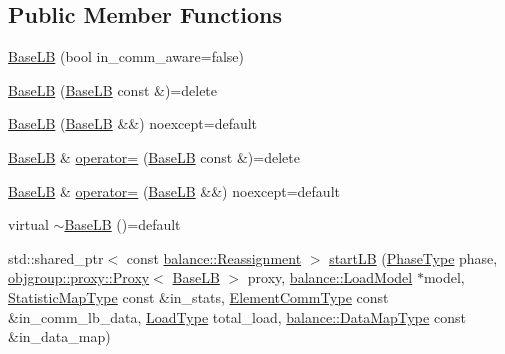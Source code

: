 \subsection*{Public Member Functions}
\begin{DoxyCompactItemize}
\item 
\hyperlink{structvt_1_1vrt_1_1collection_1_1lb_1_1_base_l_b_a96ad04c03781fc057dbfb9049f67530f}{Base\+LB} (bool in\+\_\+comm\+\_\+aware=false)
\item 
\hyperlink{structvt_1_1vrt_1_1collection_1_1lb_1_1_base_l_b_af34c68c8ecf1341189a67c3405036d16}{Base\+LB} (\hyperlink{structvt_1_1vrt_1_1collection_1_1lb_1_1_base_l_b}{Base\+LB} const \&)=delete
\item 
\hyperlink{structvt_1_1vrt_1_1collection_1_1lb_1_1_base_l_b_a1d1ae8a311e14e27b26624caee930535}{Base\+LB} (\hyperlink{structvt_1_1vrt_1_1collection_1_1lb_1_1_base_l_b}{Base\+LB} \&\&) noexcept=default
\item 
\hyperlink{structvt_1_1vrt_1_1collection_1_1lb_1_1_base_l_b}{Base\+LB} \& \hyperlink{structvt_1_1vrt_1_1collection_1_1lb_1_1_base_l_b_a94be0abcbc47bf6a3f3685f94dd5d4cb}{operator=} (\hyperlink{structvt_1_1vrt_1_1collection_1_1lb_1_1_base_l_b}{Base\+LB} const \&)=delete
\item 
\hyperlink{structvt_1_1vrt_1_1collection_1_1lb_1_1_base_l_b}{Base\+LB} \& \hyperlink{structvt_1_1vrt_1_1collection_1_1lb_1_1_base_l_b_a1e092a34c8e4eda0a05ab3a2f5a9ae45}{operator=} (\hyperlink{structvt_1_1vrt_1_1collection_1_1lb_1_1_base_l_b}{Base\+LB} \&\&) noexcept=default
\item 
virtual \hyperlink{structvt_1_1vrt_1_1collection_1_1lb_1_1_base_l_b_a2d4e31b7ae227886a24443334114269e}{$\sim$\+Base\+LB} ()=default
\item 
std\+::shared\+\_\+ptr$<$ const \hyperlink{structvt_1_1vrt_1_1collection_1_1balance_1_1_reassignment}{balance\+::\+Reassignment} $>$ \hyperlink{structvt_1_1vrt_1_1collection_1_1lb_1_1_base_l_b_a17e2cdb89806df4fbdcd579fa015f816}{start\+LB} (\hyperlink{namespacevt_a46ce6733d5cdbd735d561b7b4029f6d7}{Phase\+Type} phase, \hyperlink{structvt_1_1objgroup_1_1proxy_1_1_proxy}{objgroup\+::proxy\+::\+Proxy}$<$ \hyperlink{structvt_1_1vrt_1_1collection_1_1lb_1_1_base_l_b}{Base\+LB} $>$ proxy, \hyperlink{structvt_1_1vrt_1_1collection_1_1balance_1_1_load_model}{balance\+::\+Load\+Model} $\ast$model, \hyperlink{structvt_1_1vrt_1_1collection_1_1lb_1_1_base_l_b_acd9bdad961ac83c96b7a227de672f96c}{Statistic\+Map\+Type} const \&in\+\_\+stats, \hyperlink{structvt_1_1vrt_1_1collection_1_1lb_1_1_base_l_b_a83eb4daec14edfb8780422e95b8e38d3}{Element\+Comm\+Type} const \&in\+\_\+comm\+\_\+lb\+\_\+data, \hyperlink{namespacevt_a8fb51741340b87d7aaee0bef60e9896b}{Load\+Type} total\+\_\+load, \hyperlink{namespacevt_1_1vrt_1_1collection_1_1balance_acf152c668ed9e2e9c6b29784181d2435}{balance\+::\+Data\+Map\+Type} const \&in\+\_\+data\+\_\+map)

\end{DoxyCompactItemize}

